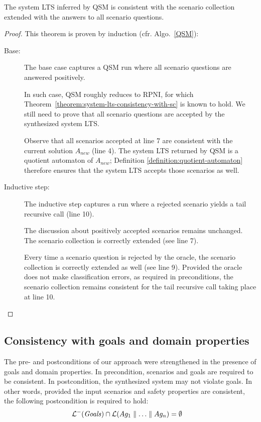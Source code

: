 \begin{theorem}
The system LTS inferred by QSM is consistent with the scenario collection extended with the answers to all scenario questions.

\begin{proof}
This theorem is proven by induction (cfr. Algo.~\ref{QSM}):
\begin{description}
\item[Base:] The base case captures a QSM run where all scenario questions are answered positively. 

In such case, QSM roughly reduces to RPNI, for which Theorem~\ref{theorem:system-lts-consistency-with-sc} is known to hold. We still need to prove that all scenario questions are accepted by the synthesized system LTS. 

Observe that all scenarios accepted at line 7 are consistent with the current solution $A_{new}$ (line 4). The system LTS returned by QSM is a quotient automaton of $A_{new}$; Definition \ref{definition:quotient-automaton} therefore ensures that the system LTS accepts those scenarios as well.

\item[Inductive step:] The inductive step captures a run where a rejected scenario yields a tail recursive call (line 10).

The discussion about positively accepted scenarios remains unchanged. The scenario collection is correctly extended (see line 7).

Every time a scenario question is rejected by the oracle, the scenario collection is correctly extended as well (see line 9). Provided the oracle does not make classification errors, as required in preconditions, the scenario collection remains consistent for the tail recursive call taking place at line 10.
\end{description}
\end{proof}
\end{theorem}


\subsection{Consistency with goals and domain properties\label{subsection:proof-with-domain-knowledge}}

The pre- and postconditions of our approach were strengthened in the presence of goals and domain properties. In precondition, scenarios and goals are required to be consistent. In postcondition, the synthesized system may not violate goals. In other words, provided the input scenarios and safety properties are consistent, the following postcondition is required to hold:
\begin{align}
&\mathcal{L}^-(\mbox{\emph{Goals}}) \cap \mathcal{L}(Ag_1 \parallel \ldots \parallel Ag_n) = \emptyset \label{consistency-of-system-lts-with-goals}
\end{align}

